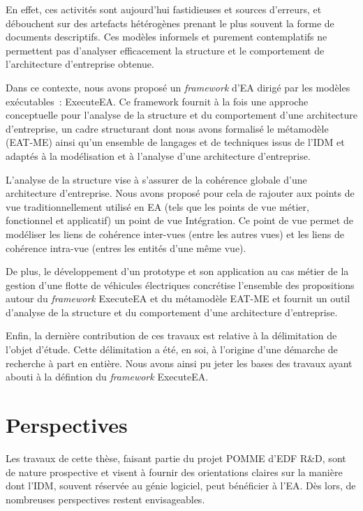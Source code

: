 En effet, ces activités sont aujourd'hui fastidieuses et sources d'erreurs,
et débouchent sur des artefacts hétérogènes prenant le plus souvent la forme
de documents descriptifs. Ces modèles informels et purement contemplatifs
ne permettent pas d'analyser efficacement 
la structure et le comportement de l'architecture d'entreprise obtenue.

Dans ce contexte, nous avons proposé un \emph{framework}
d'EA dirigé par les modèles exécutables~: ExecuteEA. Ce framework fournit à la fois une approche
conceptuelle pour l'analyse de la structure et du comportement d'une architecture d'entreprise, un cadre structurant dont nous
avons formalisé le métamodèle (EAT-ME) ainsi qu'un ensemble de langages et de techniques issus de l'IDM et adaptés à la modélisation
et à l'analyse d'une architecture d'entreprise. 

L'analyse de la structure vise à s'assurer de la cohérence globale d'une architecture d'entreprise. Nous avons
proposé pour cela de rajouter aux points de vue traditionnellement utilisé en EA (tels que les points de vue métier, fonctionnel et
applicatif) un point de vue Intégration. Ce point de vue permet de modéliser les liens de cohérence inter-vues (entre les autres vues)
et les liens de cohérence intra-vue (entres les entités d'une même vue).

De plus, le développement d'un prototype et son application au cas métier
de la gestion d'une flotte de véhicules électriques concrétise l'ensemble des
propositions autour du \emph{framework} ExecuteEA et du métamodèle EAT-ME
et fournit un outil d'analyse de la structure et du comportement
d'une architecture d'entreprise.

Enfin, la dernière contribution de ces travaux est relative à la délimitation de l'objet d'étude.
Cette délimitation a été, en soi, à l'origine d'une démarche de recherche à part en entière.
Nous avons ainsi pu jeter les bases des travaux ayant abouti à la défintion du \emph{framework} ExecuteEA.

\section{Perspectives}

Les travaux de cette thèse, faisant partie du projet POMME d'EDF R\&D, sont de nature prospective et visent à fournir 
des orientations claires sur la manière dont l'IDM, souvent réservée au génie logiciel, peut bénéficier à l'EA.
Dès lors, de nombreuses perspectives restent envisageables.

